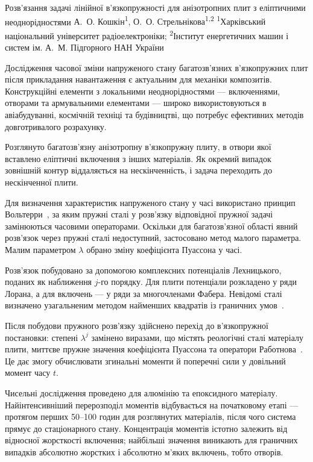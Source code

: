 \ReportHeading
  {Розв’язання задачі лінійної в’язкопружності для анізотропних плит з еліптичними неоднорідностями}
  {А.~О. Кошкін\textsuperscript{1}, О.~О. Стрельнікова\textsuperscript{1,2}}
  {\textsuperscript{1}Харківський національний університет радіоелектроніки; \textsuperscript{2}Інститут енергетичних машин і систем ім. А.~М. Підгорного НАН України}
  {}

Дослідження часової зміни напруженого стану багатозв’язних в’язкопружних плит після прикладання навантаження є актуальним для механіки композитів. Конструкційні елементи з локальними неоднорідностями --- включеннями, отворами та армувальними елементами --- широко використовуються в авіабудуванні, космічній техніці та будівництві, що потребує ефективних методів довготривалого розрахунку.

Розглянуто багатозв’язну анізотропну в’язкопружну плиту, в отвори якої вставлено еліптичні включення з інших матеріалів. Як окремий випадок зовнішній контур віддаляється на нескінченність, і задача переходить до нескінченної плити.

Для визначення характеристик напруженого стану у часі використано принцип Вольтерри~\cite{viscoplate:volterra1913}, за яким пружні сталі у розв’язку відповідної пружної задачі замінюються часовими операторами. Оскільки для багатозв’язної області явний розв’язок через пружні сталі недоступний, застосовано метод малого параметра. Малим параметром $\lambda$ обрано зміну коефіцієнта Пуассона у часі.

Розв’язок побудовано за допомогою комплексних потенціалів Лехницького, поданих як наближення $j$-го порядку. Для плити потенціали розкладено у ряди Лорана, а для включень --- у ряди за многочленами Фабера. Невідомі сталі визначено узагальненим методом найменших квадратів із граничних умов~\cite{viscoplate:koshkin2025}.

Після побудови пружного розв’язку здійснено перехід до в’язкопружної постановки: степені $\lambda^j$ замінено виразами, що містять реологічні сталі матеріалу плити, миттєве пружне значення коефіцієнта Пуассона та оператори Работнова~\cite{viscoplate:rabotnov1969}. Це дає змогу обчислювати згинальні моменти й поперечні сили у довільний момент часу $t$.

Чисельні дослідження проведено для алюмінію та епоксидного матеріалу. Найінтенсивніший перерозподіл моментів відбувається на початковому етапі --- протягом перших 50--100 годин для розглянутих матеріалів, після чого система прямує до стаціонарного стану. Концентрація моментів істотно залежить від відносної жорсткості включення; найбільші значення виникають для граничних випадків абсолютно жорстких і абсолютно м’яких включень, тобто отворів.

